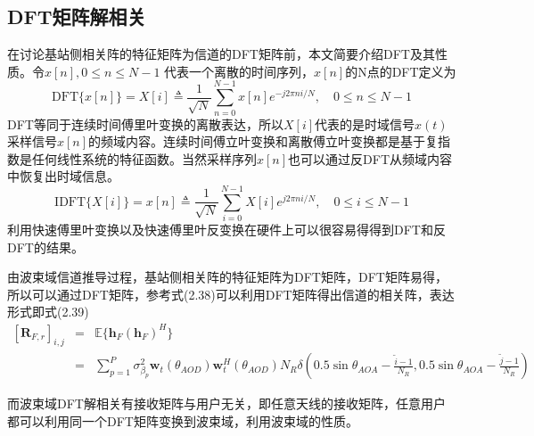 \documentclass[bachelor,nocolorlinks, printoneside]{seuthesis} %
\begin{document}
\begin{Main}
\subsection{DFT矩阵解相关}
在讨论基站侧相关阵的特征矩阵为信道的DFT矩阵前，本文简要介绍DFT及其性质。令$x[n],0 \leq n \leq N-1$ 代表一个离散的时间序列，$x[n]$的N点的DFT定义为
\begin{equation}\label{key}
\mathrm{DFT} \lbrace x[n] \rbrace = X[i] \triangleq \frac{1}{\sqrt{N}} \sum_{n=0}^{N-1}x[n]e^{-j2\pi ni/N},\quad 0 \leq n \leq N-1
\end{equation}
DFT等同于连续时间傅里叶变换的离散表达，所以$X[i]$代表的是时域信号$x(t)$采样信号$x[n]$的频域内容。连续时间傅立叶变换和离散傅立叶变换都是基于复指数是任何线性系统的特征函数。当然采样序列$x[n]$也可以通过反DFT从频域内容中恢复出时域信息。
\begin{equation}\label{key}
\mathrm{IDFT} \lbrace X[i] \rbrace = x[n] \triangleq \frac{1}{\sqrt{N}} \sum_{i=0}^{N-1}X[i]e^{j2\pi ni/N},\quad 0 \leq i \leq N-1
\end{equation}
利用快速傅里叶变换以及快速傅里叶反变换在硬件上可以很容易得得到DFT和反DFT的结果。

由波束域信道推导过程，基站侧相关阵的特征矩阵为DFT矩阵，DFT矩阵易得，所以可以通过DFT矩阵，参考式(2.38)可以利用DFT矩阵得出信道的相关阵，表达形式即式(2.39)
\begin{eqnarray}\label{key}
[ \mathbf{R}_{F,r} ]_{i,j} & = &\mathbb{E} \lbrace \mathbf{h}_{F} (\mathbf{h}_{F})^{H} \rbrace  \nonumber \\
& = & \sum_{p=1}^{P} \sigma_{\beta_p}^{2} \mathbf{w}_{t}(\theta_{AOD}) \mathbf{w}_{t}^{H}(\theta_{AOD}) N_R \delta \left( 0.5\sin \theta_{AOA} - \frac{\tilde{i}-1}{N_R} , 0.5\sin \theta_{AOA} - \frac{\tilde{j}-1}{N_R} \right) \nonumber
\end{eqnarray}

而波束域DFT解相关有接收矩阵与用户无关，即任意天线的接收矩阵，任意用户都可以利用同一个DFT矩阵变换到波束域，利用波束域的性质。


\end{Main}
\end{document}

